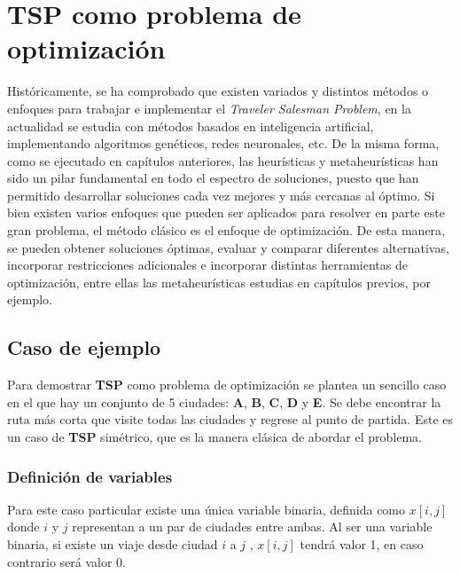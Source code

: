 \titleformat{\chapter}[display]
    {\normalfont\Large\bfseries}{\filleft\chaptertitlename\ \thechapter}{20pt}{\Huge}
    \chapter{TSP como problema de optimización}
     Históricamente, se ha comprobado que existen variados y distintos métodos o enfoques para trabajar e implementar el \textit{Traveler Salesman Problem}, en la actualidad se estudia con métodos basados en inteligencia artificial, implementando algoritmos genéticos, redes neuronales, etc. De la misma forma, como se ejecutado en capítulos anteriores, las heurísticas y metaheurísticas han sido un pilar fundamental en todo el espectro de soluciones, puesto que han permitido desarrollar soluciones cada vez mejores y más cercanas al óptimo. 
    \newline
    \newline
    Si bien existen varios enfoques que pueden ser aplicados para resolver en parte este gran problema, el método clásico es el enfoque de optimización. De esta manera, se pueden obtener soluciones óptimas, evaluar y comparar diferentes alternativas, incorporar restricciones adicionales e incorporar distintas herramientas de optimización, entre ellas las metaheurísticas estudias en capítulos previos, por ejemplo. 
    \section{Caso de ejemplo}
        Para demostrar \textbf{TSP} como problema de optimización se plantea un sencillo caso en el que hay un conjunto de 5 ciudades: \textbf{A}, \textbf{B}, \textbf{C}, \textbf{D} y \textbf{E}. Se debe encontrar la ruta más corta que visite todas las ciudades y regrese al punto de partida. Este es un caso de \textbf{TSP} simétrico, que es la manera clásica de abordar el problema. 
        
        \subsection{Definición de variables}            
            Para este caso particular existe una única variable binaria, definida como \( x[i,j]\) donde \(i\) y \(j\) representan a un par de ciudades entre ambas. Al ser una variable binaria, si existe un viaje desde ciudad \(i\) a \(j\) , \(x[i,j]\) tendrá valor 1, en caso contrario será valor 0.  
        
